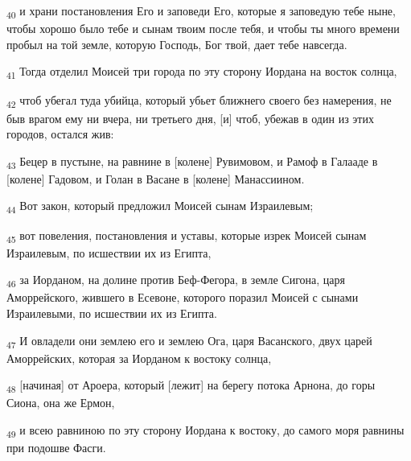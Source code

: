 \begin{tcolorbox}
\textsubscript{40} и храни постановления Его и заповеди Его, которые я заповедую тебе ныне, чтобы хорошо было тебе и сынам твоим после тебя, и чтобы ты много времени пробыл на той земле, которую Господь, Бог твой, дает тебе навсегда.
\end{tcolorbox}
\begin{tcolorbox}
\textsubscript{41} Тогда отделил Моисей три города по эту сторону Иордана на восток солнца,
\end{tcolorbox}
\begin{tcolorbox}
\textsubscript{42} чтоб убегал туда убийца, который убьет ближнего своего без намерения, не быв врагом ему ни вчера, ни третьего дня, [и] чтоб, убежав в один из этих городов, остался жив:
\end{tcolorbox}
\begin{tcolorbox}
\textsubscript{43} Бецер в пустыне, на равнине в [колене] Рувимовом, и Рамоф в Галааде в [колене] Гадовом, и Голан в Васане в [колене] Манассиином.
\end{tcolorbox}
\begin{tcolorbox}
\textsubscript{44} Вот закон, который предложил Моисей сынам Израилевым;
\end{tcolorbox}
\begin{tcolorbox}
\textsubscript{45} вот повеления, постановления и уставы, которые изрек Моисей сынам Израилевым, по исшествии их из Египта,
\end{tcolorbox}
\begin{tcolorbox}
\textsubscript{46} за Иорданом, на долине против Беф-Фегора, в земле Сигона, царя Аморрейского, жившего в Есевоне, которого поразил Моисей с сынами Израилевыми, по исшествии их из Египта.
\end{tcolorbox}
\begin{tcolorbox}
\textsubscript{47} И овладели они землею его и землею Ога, царя Васанского, двух царей Аморрейских, которая за Иорданом к востоку солнца,
\end{tcolorbox}
\begin{tcolorbox}
\textsubscript{48} [начиная] от Ароера, который [лежит] на берегу потока Арнона, до горы Сиона, она же Ермон,
\end{tcolorbox}
\begin{tcolorbox}
\textsubscript{49} и всею равниною по эту сторону Иордана к востоку, до самого моря равнины при подошве Фасги.
\end{tcolorbox}

